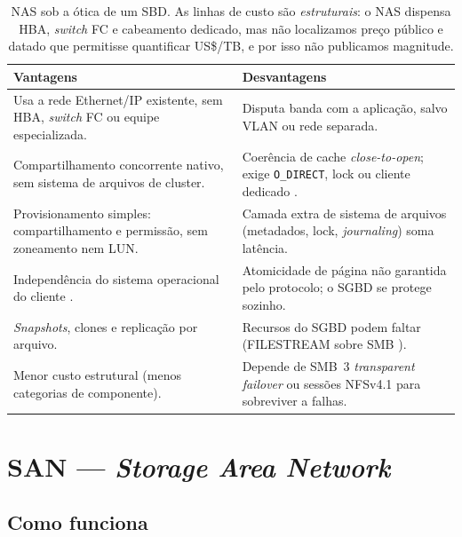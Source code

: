 \documentclass[11pt,a4paper]{article}
\begin{document}
\begin{table}[H]
\centering
\caption{NAS sob a ótica de um SBD. As linhas de custo são \emph{estruturais}: o NAS dispensa HBA,
\textit{switch} FC e cabeamento dedicado, mas não localizamos preço público e datado que permitisse
quantificar US\$/TB, e por isso não publicamos magnitude.}
\label{tab:vantnas}
{\footnotesize
\begin{tabular}{@{}L{7.2cm}L{7.6cm}@{}}
\toprule
\textbf{Vantagens} & \textbf{Desvantagens} \\
\midrule
Usa a rede Ethernet/IP existente, sem HBA, \textit{switch} FC ou equipe especializada. & Disputa banda com a aplicação, salvo VLAN ou rede separada. \\
Compartilhamento concorrente nativo, sem sistema de arquivos de cluster. & Coerência de cache \textit{close-to-open}; exige \texttt{O\_DIRECT}, lock ou cliente dedicado \cite{nfsman}. \\
Provisionamento simples: compartilhamento e permissão, sem zoneamento nem LUN. & Camada extra de sistema de arquivos (metadados, lock, \textit{journaling}) soma latência. \\
Independência do sistema operacional do cliente \cite{elmasri2018}. & Atomicidade de página não garantida pelo protocolo; o SGBD se protege sozinho. \\
\textit{Snapshots}, clones e replicação por arquivo. & Recursos do SGBD podem faltar (FILESTREAM sobre SMB \cite{mssqlsmb}). \\
Menor custo estrutural (menos categorias de componente). & Depende de SMB~3 \textit{transparent failover} ou sessões NFSv4.1 para sobreviver a falhas. \\
\bottomrule
\end{tabular}}
\end{table}
\section{SAN --- \textit{Storage Area Network}}
\label{sec:san}

\subsection{Como funciona}
\label{sec:sancomo}
\end{document}
